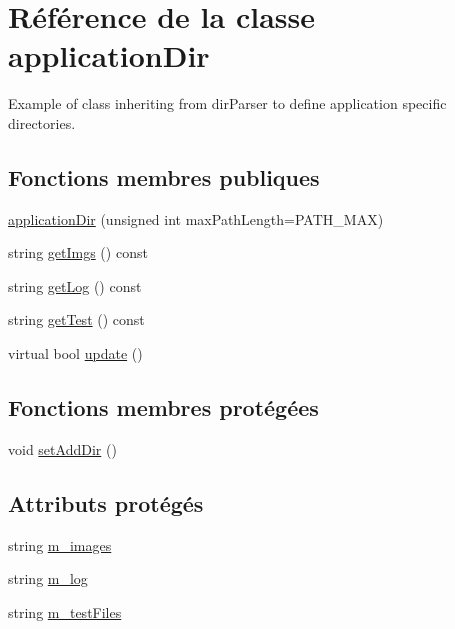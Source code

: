 \hypertarget{classapplication_dir}{\section{\-Référence de la classe application\-Dir}
\label{classapplication_dir}
}


\-Example of class inheriting from dir\-Parser to define application specific directories.  


\subsection*{\-Fonctions membres publiques}
\begin{DoxyCompactItemize}
\item 
\hyperlink{classapplication_dir_a740f817a258f793d16e6e3d05af9a154}{application\-Dir} (unsigned int max\-Path\-Length=\-P\-A\-T\-H\-\_\-\-M\-A\-X)
\item 
string \hyperlink{classapplication_dir_a75f84ad8a60ae8ab7ed2b98f31a7a16e}{get\-Imgs} () const 
\item 
string \hyperlink{classapplication_dir_a57bc7c5a61251460f98657f47728eb47}{get\-Log} () const 
\item 
string \hyperlink{classapplication_dir_abed359ac1a6744aa233bd5158029405f}{get\-Test} () const 
\item 
virtual bool \hyperlink{classapplication_dir_a5e6492c89905ddbdf33c56f34921de1e}{update} ()
\end{DoxyCompactItemize}
\subsection*{\-Fonctions membres protégées}
\begin{DoxyCompactItemize}
\item 
void \hyperlink{classapplication_dir_a19686735bf14b1665d167203aeb1aaa3}{set\-Add\-Dir} ()
\end{DoxyCompactItemize}
\subsection*{\-Attributs protégés}
\begin{DoxyCompactItemize}
\item 
string \hyperlink{classapplication_dir_a73e0e9517eb96a43acaf57f05d32773a}{m\-\_\-images}
\item 
string \hyperlink{classapplication_dir_a048258be465ad372e49ffb5475daa6ab}{m\-\_\-log}
\item 
string \hyperlink{classapplication_dir_ae2d5e9efd50b147d0d675e50d95f2e13}{m\-\_\-test\-Files}
\end{DoxyCompactItemize}


